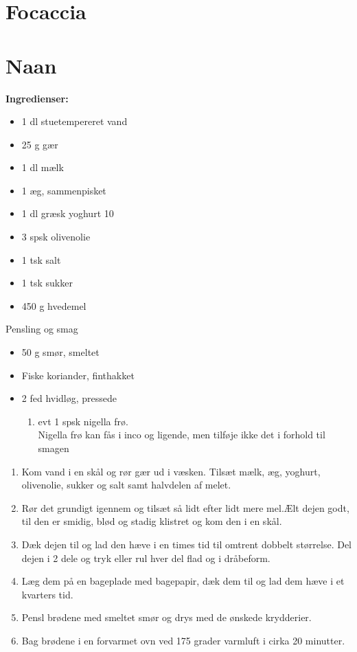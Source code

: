 \documentclass{book}
\begin{document}
{\section{Focaccia}
\begin{minipage}[t]{0.5\textwidth}
\end{minipage}
\begin{minipage}[t]{0.5\textwidth}
\end{minipage}
\newpage \section{Naan}
\begin{minipage}[t]{0.5\textwidth}
\textbf{Ingredienser:}
\begin{itemize}
    \item 1 dl stuetempereret vand
    \item25 g gær
    \item1 dl mælk
    \item1 æg, sammenpisket
    \item1 dl græsk yoghurt 10 %
    \item3 spsk olivenolie
    \item1 tsk salt
    \item1 tsk sukker
    \item450 g hvedemel
\end{itemize}
    Pensling og smag
\begin{itemize}
    \item  50 g smør, smeltet
    \item Fiske koriander, finthakket
    \item2 fed hvidløg, pressede
    \begin{enumerate}
        \item  evt 1 spsk nigella frø. \\
        Nigella frø kan fås i inco og ligende, men tilføje ikke det i forhold til smagen
    \end{enumerate}
\end{itemize}
\end{minipage}
\begin{minipage}[t]{0.5\textwidth}
\begin{enumerate}
    \item Kom vand i en skål og rør gær ud i væsken. Tilsæt mælk, æg, yoghurt, olivenolie, sukker og salt samt halvdelen af melet. 
    \item Rør det grundigt igennem og tilsæt så lidt efter lidt mere mel.Ælt dejen godt, til den er smidig, blød og stadig klistret og kom den i en skål.
    \item Dæk dejen til og lad den hæve i en times tid til omtrent dobbelt størrelse. Del dejen i 2 dele og tryk eller rul hver del flad og i dråbeform. 
    \item Læg dem på en bageplade med bagepapir, dæk dem til og lad dem hæve i et kvarters tid.
    \item Pensl brødene med smeltet smør og drys med de ønskede krydderier.
    \item Bag brødene i en forvarmet ovn ved 175 grader varmluft i cirka 20 minutter.


\end{enumerate}
\end{minipage}}
\end{document}
